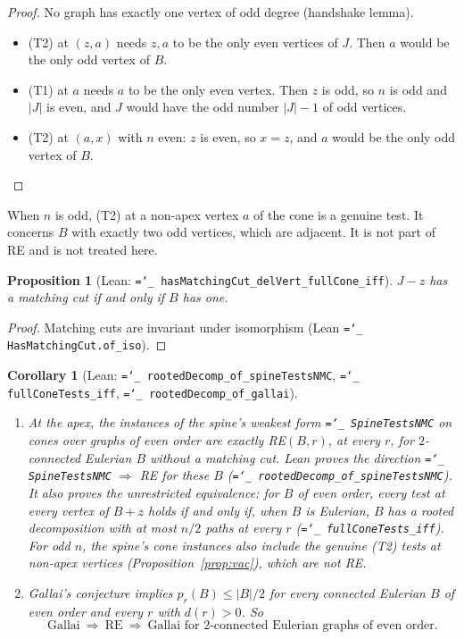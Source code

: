 \documentclass[11pt]{amsart}
\newtheorem{proposition}[theorem]{Proposition}
\newtheorem{corollary}[theorem]{Corollary}
\theoremstyle{definition}
\newcommand{\pr}{p_r}
\newcommand{\lean}[1]{\texttt{\hyphenchar\font=`\_ #1}}
\begin{document}
\begin{proof}
No graph has exactly one vertex of odd degree (handshake lemma).
\begin{itemize}[leftmargin=*]
\item (T2) at $(z,a)$ needs $z,a$ to be the only even vertices of $J$. Then $a$ would be the only odd
vertex of $B$.
\item (T1) at $a$ needs $a$ to be the only even vertex. Then $z$ is odd, so $n$ is odd and $|J|$ is even,
and $J$ would have the odd number $|J|-1$ of odd vertices.
\item (T2) at $(a,x)$ with $n$ even: $z$ is even, so $x=z$, and $a$ would be the only odd vertex of $B$.
\end{itemize}
\end{proof}

When $n$ is odd, (T2) at a non-apex vertex $a$ of the cone is a genuine test. It concerns
$B$ with exactly two odd vertices, which are adjacent. It is not part of RE and is not treated here.

\begin{proposition}[Lean: \lean{hasMatchingCut\_delVert\_fullCone\_iff}]\label{prop:mc}
$J-z$ has a matching cut if and only if $B$ has one.
\end{proposition}

\begin{proof}
Matching cuts are invariant under isomorphism (Lean \lean{HasMatchingCut.of\_iso}).
\end{proof}

\begin{corollary}[Lean: \lean{rootedDecomp\_of\_spineTestsNMC}, \lean{fullConeTests\_iff},
\lean{rootedDecomp\_of\_gallai}]\label{cor:spine}
\leavevmode
\begin{enumerate}[label=(\roman*)]
\item At the apex, the instances of the spine's weakest form \lean{SpineTestsNMC} on cones over
graphs of even order are exactly RE$(B,r)$, at every $r$, for $2$-connected Eulerian $B$
\emph{without a matching cut}. Lean proves the direction \lean{SpineTestsNMC} $\Rightarrow$ RE for
these $B$ (\lean{rootedDecomp\_of\_spineTestsNMC}). It also proves the unrestricted equivalence: for $B$
of even order, every test at every vertex of $B+z$ holds if and only if, when $B$ is Eulerian, $B$
has a rooted decomposition with at most $n/2$ paths at every $r$ (\lean{fullConeTests\_iff}). For
odd $n$, the spine's cone instances also include the genuine (T2) tests at non-apex vertices
(Proposition~\ref{prop:vac}), which are not RE.
\item Gallai's conjecture implies $\pr(B)\le |B|/2$ for every connected Eulerian $B$ of even order and
every $r$ with $d(r)>0$. So
\[
\text{Gallai}\ \Longrightarrow\ \text{RE}\ \Longrightarrow\ \text{Gallai for $2$-connected
Eulerian graphs of even order.}
\]
\end{enumerate}
\end{corollary}
\end{document}
